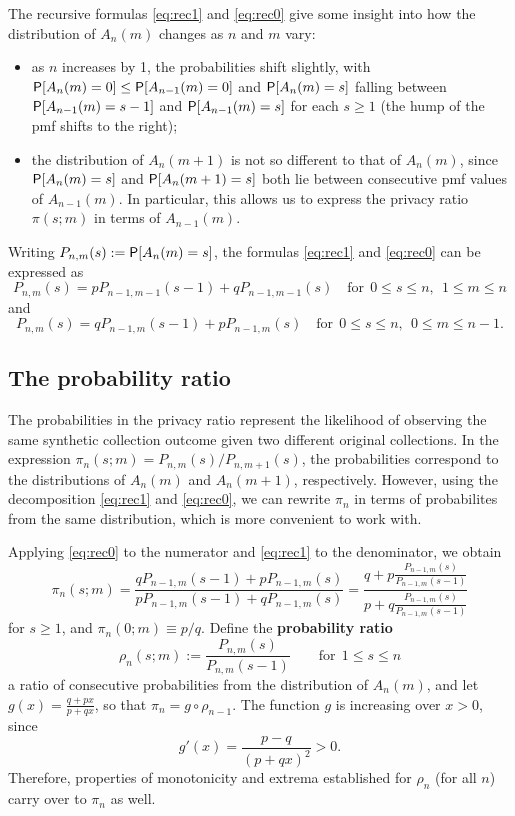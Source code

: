 \documentclass[11pt]{article}
\begin{document}
The recursive formulas \eqref{eq:rec1} and \eqref{eq:rec0} give some insight into how the distribution of $A_n(m)$ changes as $n$ and $m$ vary:
\begin{itemize}
\item  as $n$ increases by 1, the probabilities shift slightly, with $\P[A_n(m) = 0] \leq \P[A_{n-1}(m) = 0]$ and
$\P[A_n(m) = s]$ falling between $\P[A_{n-1}(m) = s-1]$ and $\P[A_{n-1}(m) = s]$ for each $s\geq 1$ (\ie the hump of the pmf shifts to the right);
\item the distribution of $A_n(m+1)$ is not so different to that of $A_n(m)$, since $\P[A_n(m) = s]$ and $\P[A_n(m+1) = s]$ both lie between consecutive pmf values of $A_{n-1}(m)$. In particular, this allows us to express the privacy ratio $\pi(s;m)$ in terms of $A_{n-1}(m)$.
\end{itemize}

Writing $P_{n,m}(s) := \P[A_n(m) = s]$, the formulas \eqref{eq:rec1} and \eqref{eq:rec0} can be expressed as
\[ P_{n,m}(s) = pP_{n-1,m-1}(s-1) + qP_{n-1,m-1}(s)
\quad\text{for}\ \ 0 \leq s \leq n,\ \ 1\leq m \leq n 
\]
and
\[ P_{n,m}(s) = qP_{n-1,m}(s-1) + pP_{n-1,m}(s)
\quad\text{for}\ \ 0 \leq s \leq n,\ \ 0\leq m \leq n-1.
\]

\subsection{The probability ratio}

The probabilities in the privacy ratio represent the likelihood of observing
the same synthetic collection outcome given two different original collections.
In the expression $\pi_n(s;m) = P_{n,m}(s) / P_{n,m+1}(s)$, the probabilities
correspond to the distributions of $A_n(m)$ and $A_n(m+1)$, respectively.
However, using the decomposition \eqref{eq:rec1} and \eqref{eq:rec0}, we can
rewrite $\pi_n$ in terms of probabilites from the same distribution, which is
more convenient to work with.

Applying \eqref{eq:rec0} to the numerator and \eqref{eq:rec1} to the denominator,
we obtain
\[ \pi_n(s;m) =
\frac{qP_{n-1,m}(s-1) + pP_{n-1,m}(s)}{pP_{n-1,m}(s-1) + qP_{n-1,m}(s)} =
\frac{q + p \frac{P_{n-1,m}(s)}{P_{n-1,m}(s-1)}}
    {p + q \frac{P_{n-1,m}(s)}{P_{n-1,m}(s-1)}}
\]
for $s \geq 1$, and $\pi_n(0;m) \equiv p/q$.
Define the \textbf{probability ratio}
\[ \rho_n(s;m) := \frac{P_{n,m}(s)}{P_{n,m}(s-1)}
\qquad\text{for}\ \ 1 \leq s\leq n \]
a ratio of consecutive probabilities from the distribution of $A_n(m)$, and let
$g(x) = \frac{q + px}{p + qx}$, so that $\pi_n = g \circ \rho_{n-1}$.
The function $g$ is increasing over $x>0$, since
\[ g'(x) = \frac{p-q}{(p+qx)^2} > 0. \]
Therefore, properties of monotonicity and extrema established for $\rho_n$ (for
all $n$) carry over to $\pi_n$ as well.
\end{document}
